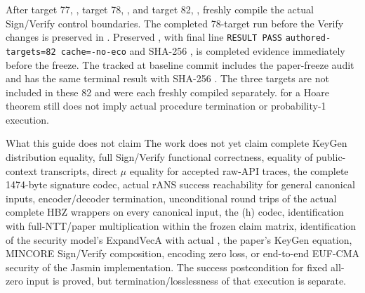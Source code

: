 \begin{boundary}
After target 77, , target 78,
, and target 82,
, freshly compile the actual Sign/Verify
control boundaries. The completed 78-target run before the Verify changes is
preserved in . Preserved
, with final line
\texttt{RESULT PASS}\newline
\texttt{authored-targets=82 cache=-no-eco} and SHA-256
,
is completed evidence immediately before the freeze. The
 tracked at baseline commit
 includes the paper-freeze audit and has the same terminal
result with SHA-256
.
The three  targets are not included
in these 82 and were each freshly compiled separately. \statusproved for a
Hoare theorem still does not imply actual procedure termination or probability-1 execution.
\end{boundary}

\begin{takeaway}{What this guide does not claim}
The work does not yet claim complete KeyGen distribution equality, full
Sign/Verify functional correctness, equality of public-context transcripts,
direct \(\mu\) equality for accepted raw-API traces, the complete 1474-byte
signature codec, actual rANS success reachability for general canonical inputs,
encoder/decoder termination, unconditional round trips of the actual complete
HBZ wrappers on every canonical input, the (h) codec, identification with
full-NTT/paper multiplication within the frozen claim matrix, identification of
the security model's ExpandVecA with actual , the paper's
KeyGen equation, MINCORE Sign/Verify composition, encoding zero loss, or
end-to-end EUF-CMA security of the Jasmin implementation. The success
postcondition for fixed all-zero input is proved, but termination/losslessness
of that execution is separate.
\end{takeaway}
